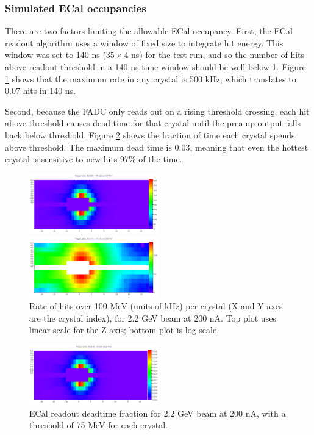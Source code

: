 \subsubsection{Simulated ECal occupancies}

There are two factors limiting the allowable ECal occupancy. First, the ECal 
readout algorithm uses a window of fixed size to integrate hit energy. This 
window was set to 140 ns ($35 \times 4$ ns) for the test run, and so the 
number of hits above readout threshold in a 140-ns time window should be well 
below 1. Figure \ref{fig:ecal_rate} shows that the maximum rate in any crystal 
is 500 kHz, which translates to 0.07 hits in 140 ns.

Second, because the FADC only reads out on a rising threshold crossing, each 
hit above threshold causes dead time for that crystal until the preamp output 
falls back below threshold. Figure \ref{fig:ecal_deadtime} shows the fraction 
of time each crystal spends above threshold. The maximum dead time is 0.03, 
meaning that even the hottest crystal is sensitive to new hits 97\% of the time.

\begin{figure}[ht]
	\includegraphics[width=0.5\textwidth]{performance/ecal_rate_100mev_22}

	\includegraphics[width=0.5\textwidth]{performance/ecal_rate_100mev_22_log}
	\caption{\small{Rate of hits over 100 MeV (units of kHz) per crystal (X and Y axes are the crystal index), 
for 2.2 GeV beam at 200 nA. Top plot uses linear scale for the Z-axis; bottom plot is log scale.}}
	\label{fig:ecal_rate}
\end{figure}

\begin{figure}[ht]
	\includegraphics[width=0.5\textwidth]{performance/ecal_deadtime_22}
	\caption{\small{ECal readout deadtime fraction for 2.2 GeV beam at 200 nA, 
with a threshold of 75 MeV for each crystal.}}
	\label{fig:ecal_deadtime}
\end{figure}


